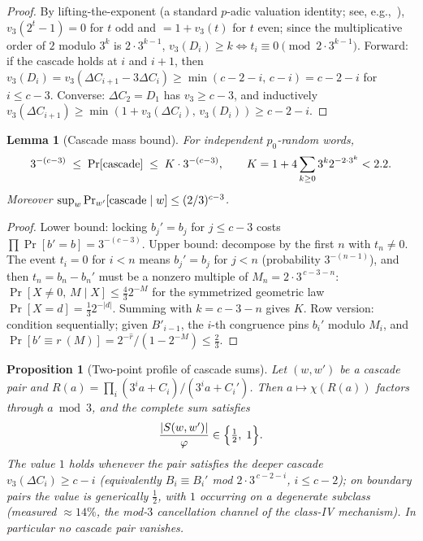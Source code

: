 \documentclass[11pt]{article}
\theoremstyle{plain}
\newtheorem{proposition}{Proposition}
\newtheorem{lemma}{Lemma}
\theoremstyle{definition}
\theoremstyle{remark}
\begin{document}
\begin{proof}
By lifting-the-exponent (a standard $p$-adic valuation identity; see,
e.g.,~\cite{gouvea2020}), $v_3(2^t-1)=0$ for $t$ odd and $=1+v_3(t)$ for $t$
even; since the multiplicative order of $2$ modulo $3^k$ is $2\cdot3^{k-1}$,
$v_3(D_i)\ge k\iff t_i\equiv0\pmod{2\cdot3^{k-1}}$. Forward: if the cascade
holds at $i$ and $i+1$, then
$v_3(D_i)=v_3(\Delta C_{i+1}-3\Delta C_i)\ge\min(c-2-i,\,c-i)=c-2-i$ for
$i\le c-3$. Converse: $\Delta C_2=D_1$ has $v_3\ge c-3$, and inductively
$v_3(\Delta C_{i+1})\ge\min(1+v_3(\Delta C_i),\,v_3(D_i))\ge c-2-i$.
\end{proof}

\begin{lemma}[Cascade mass bound]\label{lem:cascade}
For independent $p_0$-random words,
\[
3^{-(c-3)}\;\le\;\Pr[\textnormal{cascade}]\;\le\;K\cdot3^{-(c-3)},
\qquad
K=1+4\sum_{k\ge0}3^k2^{-2\cdot3^k}<2.2 .
\]
Moreover $\sup_w\Pr_{w'}[\textnormal{cascade}\mid w]\le(2/3)^{c-3}$.
\end{lemma}

\begin{proof}
Lower bound: locking $b_j'=b_j$ for $j\le c-3$ costs
$\prod\Pr[b'=b]=3^{-(c-3)}$. Upper bound: decompose by the first $n$ with
$t_n\ne0$. The event $t_i=0$ for $i<n$ means $b_j'=b_j$ for $j<n$
(probability $3^{-(n-1)}$), and then $t_n=b_n-b_n'$ must be a nonzero
multiple of $M_n=2\cdot3^{\,c-3-n}$:
$\Pr[X\ne0,\,M\mid X]\le\tfrac43 2^{-M}$ for the symmetrized geometric law
$\Pr[X=d]=\tfrac13 2^{-|d|}$. Summing with $k=c-3-n$ gives $K$. Row version:
condition sequentially; given $B'_{i-1}$, the $i$-th congruence pins
$b_i'$ modulo $M_i$, and
$\Pr[b'\equiv r\ (M)]=2^{-\hat r}/(1-2^{-M})\le\tfrac23$.
\end{proof}

\begin{proposition}[Two-point profile of cascade sums]\label{prop:twopoint}
Let $(w,w')$ be a cascade pair and
$R(a)=\prod_{i}(3^ia+C_i)/(3^ia+C_i')$. Then $a\mapsto\chi(R(a))$ factors
through $a\bmod3$, and the complete sum satisfies
\[
\frac{|S(w,w')|}{\varphi}\in\Bigl\{\tfrac12,\;1\Bigr\}.
\]
The value $1$ holds whenever the pair satisfies the \emph{deeper} cascade
$v_3(\Delta C_i)\ge c-i$ (equivalently $B_i\equiv B_i'$ mod
$2\cdot3^{\,c-2-i}$, $i\le c-2$); on boundary pairs the value is generically
$\tfrac12$, with $1$ occurring on a degenerate subclass (measured $\approx14\%$,
the mod-$3$ cancellation channel of the class-IV mechanism). In particular
\emph{no cascade pair vanishes}.
\end{proposition}
\end{document}
